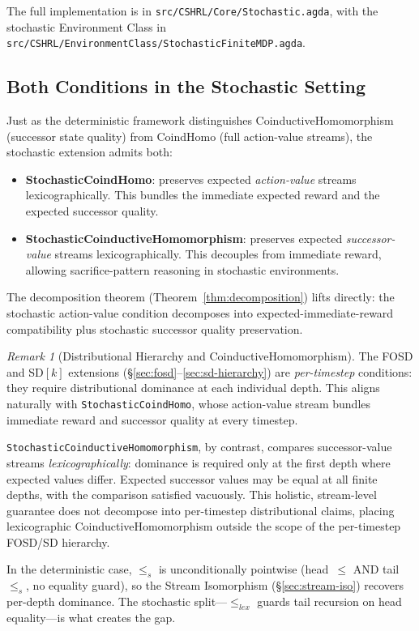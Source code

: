 \documentclass[9pt,a4paper]{article}
\newcommand{\fpath}[1]{\nolinkurl{#1}}
\theoremstyle{plain}
\theoremstyle{definition}
\theoremstyle{remark}
\newtheorem{remark}{Remark}
\begin{document}
The full implementation is in \fpath{src/CSHRL/Core/Stochastic.agda}, with the stochastic Environment Class in \fpath{src/CSHRL/EnvironmentClass/StochasticFiniteMDP.agda}.

\subsection{Both Conditions in the Stochastic Setting}

Just as the deterministic framework distinguishes CoinductiveHomomorphism (successor state quality) from CoindHomo (full action-value streams), the stochastic extension admits both:

\begin{itemize}
\item \textbf{StochasticCoindHomo}: preserves expected \emph{action-value} streams lexicographically.  This bundles the immediate expected reward and the expected successor quality.
\item \textbf{StochasticCoinductiveHomomorphism}: preserves expected \emph{successor-value} streams lexicographically.  This decouples from immediate reward, allowing sacrifice-pattern reasoning in stochastic environments.
\end{itemize}

\noindent The decomposition theorem (Theorem~\ref{thm:decomposition}) lifts directly: the stochastic action-value condition decomposes into expected-immediate-reward compatibility plus stochastic successor quality preservation.

\begin{remark}[Distributional Hierarchy and CoinductiveHomomorphism]
The FOSD and SD$[k]$ extensions (\S\ref{sec:fosd}--\ref{sec:sd-hierarchy}) are \emph{per-timestep} conditions: they require distributional dominance at each individual depth.  This aligns naturally with \texttt{StochasticCoindHomo}, whose action-value stream bundles immediate reward and successor quality at every timestep.

\texttt{StochasticCoinductiveHomomorphism}, by contrast, compares successor-value streams \emph{lexicographically}: dominance is required only at the first depth where expected values differ.  Expected successor values may be equal at all finite depths, with the comparison satisfied vacuously.  This holistic, stream-level guarantee does not decompose into per-timestep distributional claims, placing lexicographic CoinductiveHomomorphism outside the scope of the per-timestep FOSD/SD hierarchy.

In the deterministic case, $\le_s$ is unconditionally pointwise (head~$\le$ AND tail~$\le_s$, no equality guard), so the Stream Isomorphism (\S\ref{sec:stream-iso}) recovers per-depth dominance.  The stochastic split---$\le_{lex}$ guards tail recursion on head equality---is what creates the gap.
\end{remark}
\end{document}

